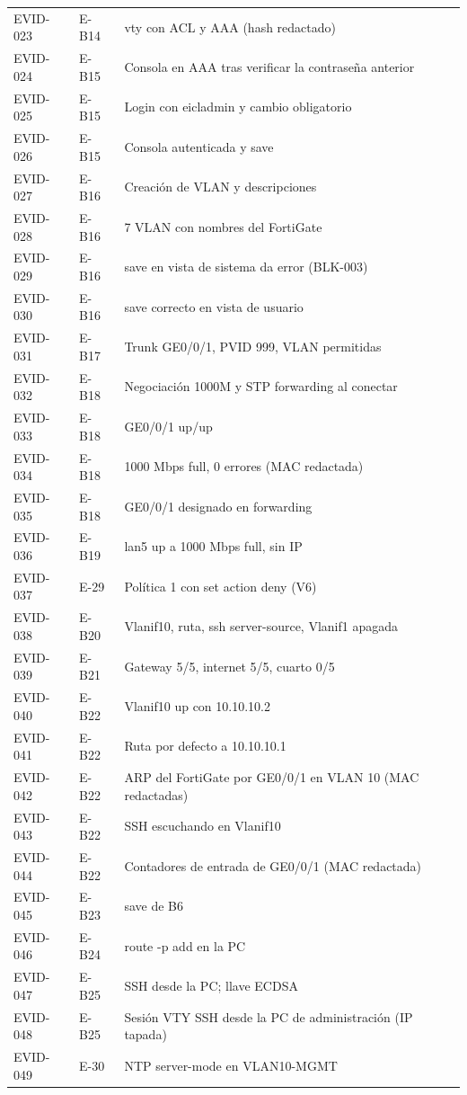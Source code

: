 \documentclass[11pt,a4paper]{article}
\begin{document}
{\begin{longtable}{L{1.6cm} L{2.1cm} L{11.6cm}}
  EVID-023 & E-B14 & vty con ACL y AAA (hash redactado)\\
  EVID-024 & E-B15 & Consola en AAA tras verificar la contraseña anterior\\
  EVID-025 & E-B15 & Login con eicladmin y cambio obligatorio\\
  EVID-026 & E-B15 & Consola autenticada y save\\
  EVID-027 & E-B16 & Creación de VLAN y descripciones\\
  EVID-028 & E-B16 & 7 VLAN con nombres del FortiGate\\
  EVID-029 & E-B16 & save en vista de sistema da error (BLK-003)\\
  EVID-030 & E-B16 & save correcto en vista de usuario\\
  EVID-031 & E-B17 & Trunk GE0/0/1, PVID 999, VLAN permitidas\\
  EVID-032 & E-B18 & Negociación 1000M y STP forwarding al conectar\\
  EVID-033 & E-B18 & GE0/0/1 up/up\\
  EVID-034 & E-B18 & 1000 Mbps full, 0 errores (MAC redactada)\\
  EVID-035 & E-B18 & GE0/0/1 designado en forwarding\\
  EVID-036 & E-B19 & lan5 up a 1000 Mbps full, sin IP\\
  EVID-037 & E-29 & Política 1 con set action deny (V6)\\
  EVID-038 & E-B20 & Vlanif10, ruta, ssh server-source, Vlanif1 apagada\\
  EVID-039 & E-B21 & Gateway 5/5, internet 5/5, cuarto 0/5\\
  EVID-040 & E-B22 & Vlanif10 up con 10.10.10.2\\
  EVID-041 & E-B22 & Ruta por defecto a 10.10.10.1\\
  EVID-042 & E-B22 & ARP del FortiGate por GE0/0/1 en VLAN 10 (MAC redactadas)\\
  EVID-043 & E-B22 & SSH escuchando en Vlanif10\\
  EVID-044 & E-B22 & Contadores de entrada de GE0/0/1 (MAC redactada)\\
  EVID-045 & E-B23 & save de B6\\
  EVID-046 & E-B24 & route -p add en la PC\\
  EVID-047 & E-B25 & SSH desde la PC; llave ECDSA\\
  EVID-048 & E-B25 & Sesión VTY SSH desde la PC de administración (IP tapada)\\
  EVID-049 & E-30 & NTP server-mode en VLAN10-MGMT\\

\end{longtable}}
\end{document}
